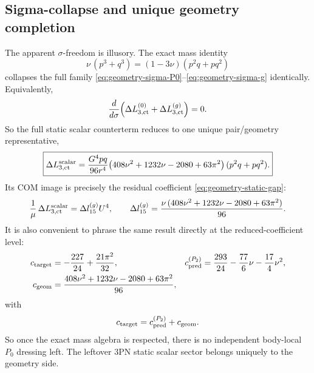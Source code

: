 \documentclass[11pt]{article}
\begin{document}
\subsection{Sigma-collapse and unique geometry completion}
\label{sec:geometry-sigma-collapse}

The apparent $\sigma$-freedom is illusory.  The exact mass identity
\begin{equation}
\boxed{
\nu\,(p^3+q^3)=(1-3\nu)(p^2q+pq^2)
}
\label{eq:geometry-mass-identity}
\end{equation}
collapses the full family
\eqref{eq:geometry-sigma-P0}--\eqref{eq:geometry-sigma-g} identically.
Equivalently,
\begin{equation}
\frac{d}{d\sigma}
\Bigl(
\Delta L_{3,\rm ct}^{(0)}+\Delta L_{3,\rm ct}^{(g)}
\Bigr)=0.
\label{eq:geometry-dsigma-zero}
\end{equation}
So the full static scalar counterterm reduces to one unique pair/geometry
representative,
\begin{equation}
\boxed{
\Delta L_{3,\rm ct}^{\rm scalar}
=
\frac{G^4pq}{96r^4}
\bigl(408\nu^2+1232\nu-2080+63\pi^2\bigr)
\,(p^2q+pq^2).
}
\label{eq:geometry-unique-counterterm}
\end{equation}
Its COM image is precisely the residual coefficient
\eqref{eq:geometry-static-gap}:
\begin{equation}
\frac{1}{\mu}\,\Delta L_{3,\rm ct}^{\rm scalar}
=
\Delta l_{15}^{(g)}U^4,
\qquad
\Delta l_{15}^{(g)}
=
\frac{\nu\,(408\nu^2+1232\nu-2080+63\pi^2)}{96}.
\label{eq:geometry-unique-com-image}
\end{equation}
It is also convenient to phrase the same result directly at the reduced-coefficient
level:
\begin{equation}
\begin{aligned}
 c_{\rm target}
 &=-\frac{227}{24}+\frac{21\pi^2}{32},
 &
 c_{\rm pred}^{(P_2)}
 &=\frac{293}{24}-\frac{77}{6}\nu-\frac{17}{4}\nu^2,
 \\
 c_{\rm geom}
 &=\frac{408\nu^2+1232\nu-2080+63\pi^2}{96},
\end{aligned}
\label{eq:geometry-c-target-pred-gap}
\end{equation}
with
\begin{equation}
 c_{\rm target}=c_{\rm pred}^{(P_2)}+c_{\rm geom}.
\label{eq:geometry-target-decomposition}
\end{equation}
So once the exact mass algebra is respected, there is no independent body-local
$P_0$ dressing left.  The leftover $3$PN static scalar sector belongs uniquely
to the geometry side.
\end{document}

